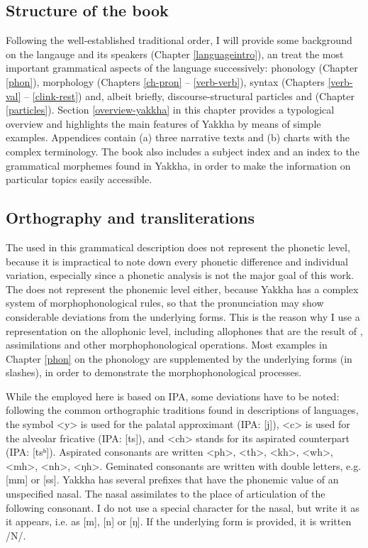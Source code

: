 \subsection{Structure of the book}


Following the well-established traditional order, I will provide some background on the langauge and its speakers (Chapter \ref{languageintro}), an treat the most important grammatical aspects of the language successively: phonology (Chapter \ref{phon}), morphology (Chapters \ref{ch-pron} – \ref{verb-verb}), syntax (Chapters \ref{verb-val} – \ref{clink-rest}) and, albeit briefly, discourse-structural particles and  (Chapter \ref{particles}). Section \ref{overview-yakkha} in this chapter provides a typological overview and highlights the main features of Yakkha by means of simple examples. Appendices contain (a) three narrative texts and  (b) charts with the complex  terminology. The book also includes  a subject index and an index to the grammatical morphemes found in Yakkha, in order to make the information on particular topics easily accessible. 


\subsection{Orthography and transliterations}\label{orth}

The  used in this grammatical description does not represent the phonetic level, because it is impractical to note down every phonetic difference and individual variation, especially since a phonetic analysis is not the major goal of this work. The  does not represent the phonemic level either, because Yakkha has a complex system of morphophonological rules, so that the pronunciation may show considerable deviations from the underlying forms. This is the reason why I use a representation on the allophonic level, including allophones that are the result of , assimilations and other morphophonological operations. Most examples in Chapter \ref{phon} on the phonology  are supplemented by the underlying forms (in slashes), in order to demonstrate the morphophonological processes.

While the   employed here is based on IPA, some deviations have to be noted: following the common orthographic traditions found in descriptions of  languages, the symbol <y> is used for the palatal approximant (IPA: [j]), <c> is used for the alveolar fricative (IPA: [ts]), and <ch> stands for its aspirated counterpart (IPA: [tsʰ]). Aspirated consonants are written <ph>, <th>, <kh>, <wh>, <mh>, <nh>, <ŋh>. Geminated consonants are written with double letters, e.g. [mm] or [ss]. Yakkha has several prefixes that have the phonemic value of an unspecified  nasal. The nasal assimilates to the place of articulation of the following consonant. I do not use a special character for the nasal, but write it as it appears, i.e. as [m], [n] or [ŋ]. If the underlying form is provided, it is written /N/. 

